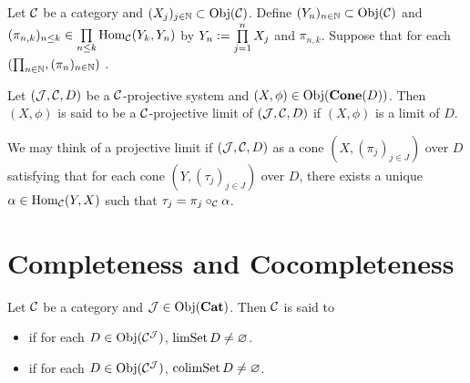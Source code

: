 \documentclass{book}
\begin{document}
	
	\begin{ex}
		Let $\mathcal{C}$ be a category and $(X_j)_{j \in \mathbb{N}} \subset \operatorname{Obj}(\mathcal{C})$. Define $(Y_n)_{n \in \mathbb{N}} \subset \operatorname{Obj}(\mathcal{C})$ and $(\pi_{n, k})_{n \leq k} \in \prod\limits_{n \leq k} \operatorname{Hom}_{\mathcal{C}}(Y_k, Y_n)$ by $Y_n \vcentcolon= \prod\limits_{j=1}^n X_j$ and $\pi_{n,k}$.  Suppose that for each  $(\prod_{n \in \mathbb{N}}, (\pi_n)_{n \in \mathbb{N}})$ . 
	\end{ex}

	\begin{defn}
		Let $(\mathcal{J}, \mathcal{C}, D)$ be a $\mathcal{C}$-projective system and $(X, \phi) \in \operatorname{Obj}(\operatorname*{\text{\textbf{Cone}}}(D))$. Then $(X, \phi)$ is said to be a $\mathcal{C}$-projective limit of $(\mathcal{J}, \mathcal{C}, D)$ if $(X, \phi)$ is a limit of $D$. 
	\end{defn}

	
\begin{note}
	We may think of a projective limit if $(\mathcal{J}, \mathcal{C}, D)$ as a cone $(X, (\pi_j)_{j \in J})$ over $D$ satisfying that for each cone $(Y, (\tau_j)_{j \in J})$ over $D$, there exists a unique $\alpha \in \operatorname{Hom}_{\mathcal{C}}(Y, X)$ such that $\tau_j = \pi_j \circ_{\mathcal{C}} \alpha$. 
\end{note}

















































\newpage
\section{Completeness and Cocompleteness}

\begin{defn} 
	Let $\mathcal{C}$ be a category and $\mathcal{J} \in \operatorname{Obj}(\operatorname*{\text{\textbf{Cat}}})$. Then $\mathcal{C}$ is said to 
	\begin{itemize}
		\item {} if for each $D \in \operatorname{Obj}(\mathcal{C}^{\mathcal{J}})$, $\operatorname{limSet} D \neq \varnothing$. 
		\item {} if for each $D \in \operatorname{Obj}(\mathcal{C}^{\mathcal{J}})$, $\operatorname{colimSet} D \neq \varnothing$. 
	\end{itemize}
\end{defn}
\end{document}
